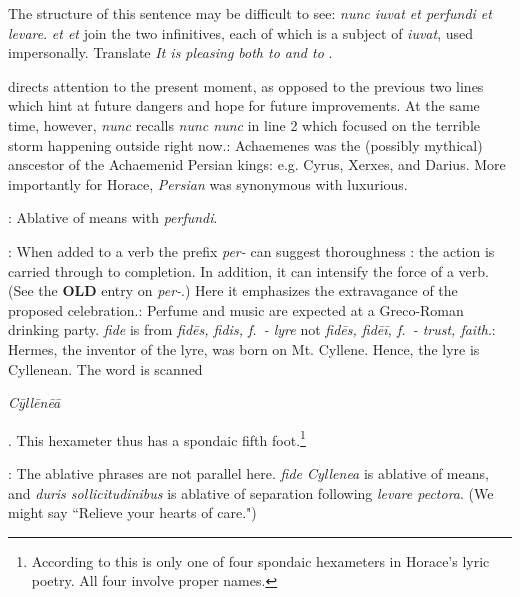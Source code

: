
The structure of this sentence may be difficult to see: \textit{nunc iuvat et perfundi et levare}.  \textit{et \lips et} join the two infinitives, each of which is a subject of \textit{iuvat}, used impersonally.  Translate \textit{It is pleasing both to \lips and to \lips}.


 directs attention to the present moment, as opposed to the previous two lines which hint at future dangers and hope for future improvements.  At the same time, however, \textit{nunc} recalls \textit{nunc \lips nunc} in line 2 which focused on the terrible storm happening outside right now.\indent{}: Achaemenes was the (possibly mythical) anscestor of the Achaemenid Persian kings: e.g. Cyrus, Xerxes, and Darius.  More importantly for Horace, \textit{Persian} was synonymous with luxurious.


: Ablative of means with \textit{perfundi}.


: When added to a verb the prefix \textit{per-} can suggest thoroughness : the action is carried through to completion.  In addition, it can intensify the force of a verb.  (See the \textbf{OLD} entry on \textit{per-}.)  Here it emphasizes the extravagance of the proposed celebration.\indent{}: Perfume and music are expected at a Greco-Roman drinking party.  \textit{fide} is from \textit{fidēs, fidis, f.\ - lyre} not  \textit{fidēs, fidēī, f.\ - trust, faith}.\indent{}:  Hermes, the inventor of the lyre, was born on Mt. Cyllene.  Hence, the lyre is Cyllenean.  The word is scanned \begin{metrica}\textit{C\=yll\=en\=e\=a}\end{metrica}.  This hexameter thus has a spondaic fifth foot.\footnote{According to \citet[220]{mankin1995} this is only one of four spondaic hexameters in Horace's lyric poetry.  All four involve proper names.}


: The ablative phrases are not parallel here.  \textit{fide Cyllenea} is ablative of means, and \textit{duris sollicitudinibus} is ablative of separation following \textit{levare pectora}.  (We might say ``Relieve your hearts of care.") 


